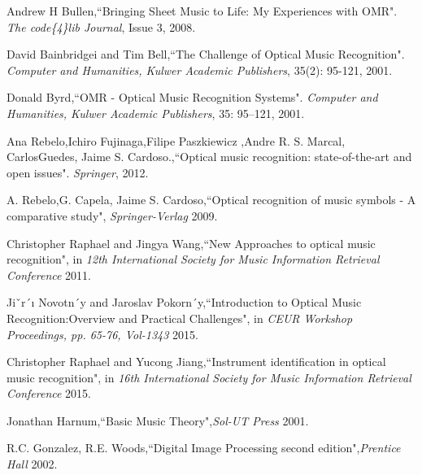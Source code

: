 \documentclass[journal]{IEEEtran}
\begin{document}
%
%
%
\begin{thebibliography}{1}
  
Andrew H Bullen,``Bringing Sheet Music to Life: My Experiences with OMR". \emph{The code\{4\}lib Journal}, Issue 3, 2008.

David Bainbridgei and Tim Bell,``The Challenge of Optical Music Recognition". \emph{Computer and Humanities, Kulwer Academic Publishers}, 35(2): 95-121, 2001.

Donald Byrd,``OMR - Optical Music Recognition Systems". \emph{Computer and Humanities, Kulwer Academic Publishers}, 35: 95–121, 2001.

Ana Rebelo,Ichiro Fujinaga,Filipe Paszkiewicz ,Andre R. S. Marcal, CarlosGuedes, Jaime S. Cardoso.,``Optical music recognition: state-of-the-art and open issues". \emph{Springer}, 2012.

A. Rebelo,G. Capela, Jaime S. Cardoso,``Optical recognition of music symbols - A comparative study", \emph{Springer-Verlag} 2009.

Christopher Raphael and Jingya Wang,``New Approaches to optical music recognition", in \emph{12th International Society for Music Information Retrieval Conference} 2011.

Jiˇr´ı Novotn´y and Jaroslav Pokorn´y,``Introduction to Optical Music Recognition:Overview and Practical Challenges", in \emph{CEUR Workshop Proceedings, pp. 65-76, Vol-1343 } 2015.

Christopher Raphael and Yucong Jiang,``Instrument identification in optical music recognition", in \emph{16th International Society for Music Information Retrieval Conference} 2015.

Jonathan Harnum,``Basic Music Theory",\emph{Sol-UT Press} 2001.

R.C. Gonzalez, R.E. Woods,``Digital Image Processing second edition",\emph{Prentice Hall} 2002.


\end{thebibliography}
\end{document}
